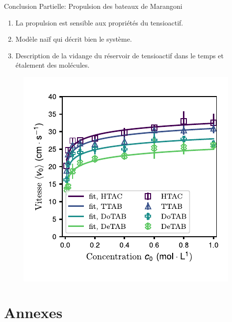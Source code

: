 \documentclass[aspectratio=169,10pt]{beamer}
\begin{document}
  
\begin{frame}{Conclusion Partielle: Propulsion des bateaux de Marangoni}
    \begin{enumerate}
    \item La propulsion est sensible aux propriétés du tensioactif.
    \item Modèle naïf qui décrit bien le système.
    \item Description de la vidange du réservoir de tensioactif dans le temps et étalement des molécules.
    \end{enumerate}
    \begin{figure}
      \includegraphics[width=.4\textwidth]{./figures/Bateau_v0_final.pdf}
  \end{figure}
\end{frame}
  

\section{Annexes}
\end{document}
